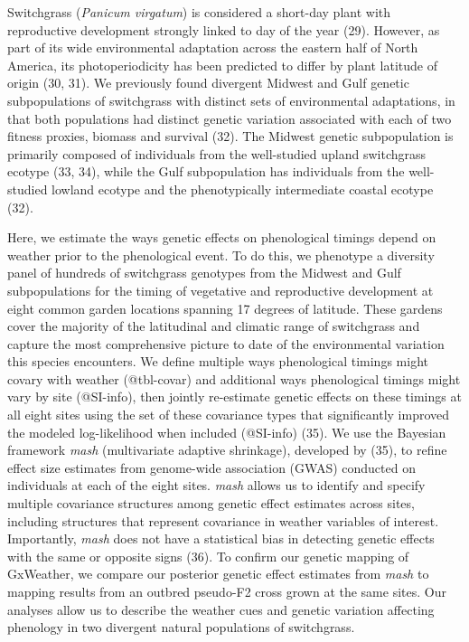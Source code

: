 \documentclass[
  9pt,
  twocolumn,
  twoside]{pnas-new}
\begin{document}
Switchgrass (\emph{Panicum virgatum}) is considered a short-day plant
with reproductive development strongly linked to day of the year (29).
However, as part of its wide environmental adaptation across the eastern
half of North America, its photoperiodicity has been predicted to differ
by plant latitude of origin (30, 31). We previously found divergent
Midwest and Gulf genetic subpopulations of switchgrass with distinct
sets of environmental adaptations, in that both populations had distinct
genetic variation associated with each of two fitness proxies, biomass
and survival (32). The Midwest genetic subpopulation is primarily
composed of individuals from the well-studied upland switchgrass ecotype
(33, 34), while the Gulf subpopulation has individuals from the
well-studied lowland ecotype and the phenotypically intermediate coastal
ecotype (32).

Here, we estimate the ways genetic effects on phenological timings
depend on weather prior to the phenological event. To do this, we
phenotype a diversity panel of hundreds of switchgrass genotypes from
the Midwest and Gulf subpopulations for the timing of vegetative and
reproductive development at eight common garden locations spanning 17
degrees of latitude. These gardens cover the majority of the latitudinal
and climatic range of switchgrass and capture the most comprehensive
picture to date of the environmental variation this species encounters.
We define multiple ways phenological timings might covary with weather
(@tbl-covar) and additional ways phenological timings might vary by site
(@SI-info), then jointly re-estimate genetic effects on these timings at
all eight sites using the set of these covariance types that
significantly improved the modeled log-likelihood when included
(@SI-info) (35). We use the Bayesian framework \emph{mash} (multivariate
adaptive shrinkage), developed by (35), to refine effect size estimates
from genome-wide association (GWAS) conducted on individuals at each of
the eight sites. \emph{mash} allows us to identify and specify multiple
covariance structures among genetic effect estimates across sites,
including structures that represent covariance in weather variables of
interest. Importantly, \emph{mash} does not have a statistical bias in
detecting genetic effects with the same or opposite signs (36). To
confirm our genetic mapping of GxWeather, we compare our posterior
genetic effect estimates from \emph{mash} to mapping results from an
outbred pseudo-F2 cross grown at the same sites. Our analyses allow us
to describe the weather cues and genetic variation affecting phenology
in two divergent natural populations of switchgrass.
\end{document}
